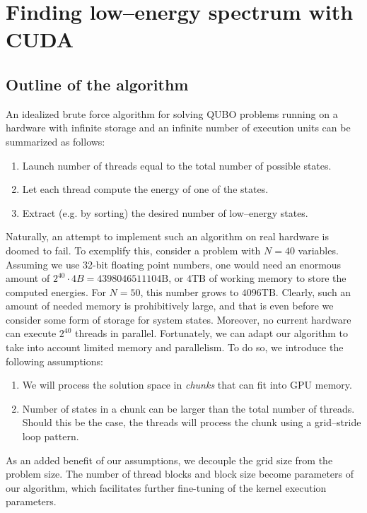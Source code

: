 
\section{Finding low--energy spectrum with CUDA}
\subsection{Outline of the algorithm}
An idealized brute force algorithm for solving QUBO problems running on a
hardware with infinite storage and an infinite number of execution units can be
summarized as follows:
\begin{enumerate}
  \item Launch number of threads equal to the total number of possible states.
  \item Let each thread compute the energy of one of the states.
  \item Extract (e.g. by sorting) the desired number of low--energy states.
\end{enumerate}
Naturally, an attempt to implement such an algorithm on real hardware is doomed
to fail. To exemplify this, consider a problem with $N=40$ variables. Assuming
we use 32-bit floating point numbers, one would need an enormous amount of
$2^{40}\cdot 4B = 4398046511104\mbox{B}$, or $4\mbox{TB}$ of working memory to
store the computed energies. For $N=50$, this number grows to $4096\mbox{TB}$.
Clearly, such an amount of needed memory is prohibitively large, and that is
even before we consider some form of storage for system states. Moreover, no
current hardware can execute $2^{40}$ threads in parallel. Fortunately, we can
adapt our algorithm to take into account limited memory and parallelism. To do
so, we introduce the following assumptions:
\begin{enumerate}
  \item We will process the solution space in \emph{chunks} that can fit into GPU
    memory.
  \item Number of states in a chunk can be larger than the total number of threads.
    Should this be the case, the threads will process the chunk using a
    grid--stride loop pattern.
\end{enumerate}
As an added benefit of our assumptions, we decouple the grid size from the
problem size. The number of thread blocks and block size become parameters of
our algorithm, which facilitates further fine-tuning of the kernel execution
parameters.

